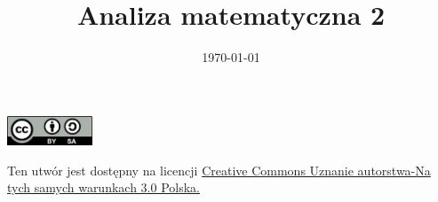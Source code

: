 \documentclass[12pt,a4paper]{article}
\theoremstyle{definition}
\begin{document}
\title{ Analiza matematyczna 2}
\author{\vspace{-5ex}}
\date{\today}
\maketitle
\tableofcontents

\begin{center}
\leavevmode

\includegraphics[width=1in]{by-sa.png}
\end{center}
\label{fig:cc}
\scriptsize{Ten utwór jest dostępny na licencji  \href{http://creativecommons.org/licenses/by-sa/3.0/pl/}{Creative Commons Uznanie autorstwa-Na tych samych warunkach 3.0 Polska.}}


\pagebreak
\end{document}

